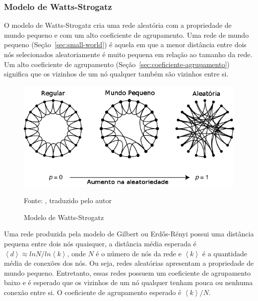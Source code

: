 \documentclass[12pt,a4paper]{article}
\theoremstyle{hypo}
\newcommand{\avg}[1]{\left\langle #1 \right\rangle} %
\newcommand{\source}[1]{\vspace{-10pt} \caption*{Fonte: {#1}} }
\begin{document}
\subsubsection{Modelo de Watts-Strogatz}

O modelo de Watts-Strogatz cria uma rede aleatória com a propriedade de mundo pequeno e com um alto coeficiente de agrupamento. Uma rede de mundo pequeno (Seção~\ref{sec:small-world}) é aquela em que a menor distância entre dois nós selecionados aleatoriamente é muito pequena em relação ao tamanho da rede. Um alto coeficiente de agrupamento (Seção~\ref{sec:coeficiente-agrupamento}) significa que os vizinhos de um nó qualquer também são vizinhos entre si.

\begin{figure}[ht]
    \centering
    \includegraphics[scale=0.6]{small-world.png}
    \caption{Modelo de Watts-Strogatz}
    \source{, traduzido pelo autor}
\end{figure}    

Uma rede produzida pela modelo de Gilbert ou Erdős-Rényi possui uma distância pequena entre dois nós quaisquer, a distância média esperada é $\avg{d} \approx ln N / ln \avg{k}$, onde $N$ é o número de nós da rede e $\avg{k}$ é a quantidade média de conexões dos nós. Ou seja, redes aleatórias apresentam a propriedade de mundo pequeno. Entretanto, essas redes possuem um coeficiente de agrupamento baixo e é esperado que os vizinhos de um nó qualquer tenham pouca ou nenhuma conexão entre si. O coeficiente de agrupamento esperado é $\avg{k}/N$.
\end{document}
